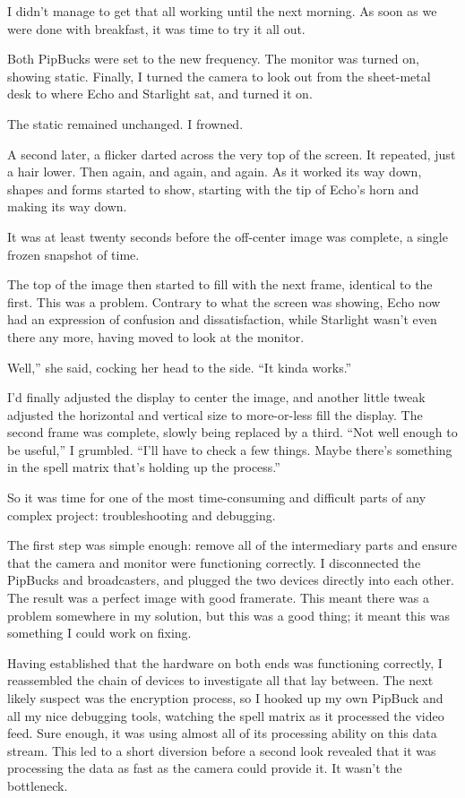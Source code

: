 I didn’t manage to get that all working until the next morning. As soon as we were done with breakfast, it was time to try it all out.

Both PipBucks were set to the new frequency. The monitor was turned on, showing static. Finally, I turned the camera to look out from the sheet-metal desk to where Echo and Starlight sat, and turned it on.

The static remained unchanged. I frowned.

A second later, a flicker darted across the very top of the screen. It repeated, just a hair lower. Then again, and again, and again. As it worked its way down, shapes and forms started to show, starting with the tip of Echo’s horn and making its way down.

It was at least twenty seconds before the off-center image was complete, a single frozen snapshot of time.

The top of the image then started to fill with the next frame, identical to the first. This was a problem. Contrary to what the screen was showing, Echo now had an expression of confusion and dissatisfaction, while Starlight wasn’t even there any more, having moved to look at the monitor.

\leavevmode{}Well,” she said, cocking her head to the side. “It kinda works.”

I’d finally adjusted the display to center the image, and another little tweak adjusted the horizontal and vertical size to more-or-less fill the display. The second frame was complete, slowly being replaced by a third. “Not well enough to be useful,” I grumbled. “I’ll have to check a few things. Maybe there’s something in the spell matrix that’s holding up the process.”

So it was time for one of the most time-consuming and difficult parts of any complex project: troubleshooting and debugging.

The first step was simple enough: remove all of the intermediary parts and ensure that the camera and monitor were functioning correctly. I disconnected the PipBucks and broadcasters, and plugged the two devices directly into each other. The result was a perfect image with good framerate. This meant there was a problem somewhere in my solution, but this was a good thing; it meant this was something I could work on fixing.

Having established that the hardware on both ends was functioning correctly, I reassembled the chain of devices to investigate all that lay between. The next likely suspect was the encryption process, so I hooked up my own PipBuck and all my nice debugging tools, watching the spell matrix as it processed the video feed. Sure enough, it was using almost all of its processing ability on this data stream. This led to a short diversion before a second look revealed that it was processing the data as fast as the camera could provide it. It wasn’t the bottleneck.

